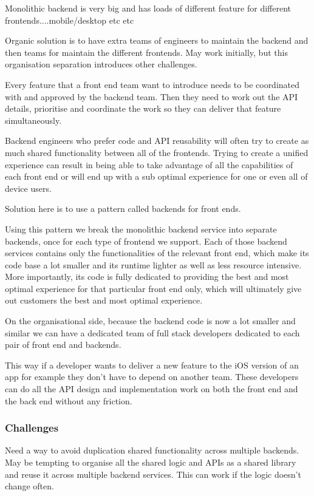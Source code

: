 Monolithic backend is very big and has loads of different feature for different frontends....mobile/desktop etc etc

Organic solution is to have extra teams of engineers to maintain the backend and then teams for maintain the different frontends.
May work initially, but this organisation separation introduces other challenges.

Every feature that a front end team want to introduce needs to be coordinated with and approved by the backend team.
Then they need to work out the API details, prioritise and coordinate the work so they can deliver that feature simultaneously.

Backend engineers who prefer code and API reusability will often try to create as much shared functionality between all of the frontends.
Trying to create a unified experience can result in being able to take advantage of all the capabilities of each front end or will end up with a sub optimal experience for one or even all of device users.

Solution here is to use a pattern called backends for front ends.

Using this pattern we break the monolithic backend service into separate backends, once for each type of frontend we support.
Each of those backend services contains only the functionalities of the relevant front end, which make its code base a lot smaller and its runtime lighter as well as less resource intensive.
More importantly, its code is fully dedicated to providing the best and most optimal experience for that particular front end only, which will ultimately give out customers the best and most optimal experience.

On the organisational side, because the backend code is now a lot smaller and similar we can have a dedicated team of full stack developers dedicated to each pair of front end and backends.

This way if a developer wants to deliver a new feature to the iOS version of an app for example they don't have to depend on another team.
These developers can do all the API design and implementation work on both the front end and the back end without any friction.

\subsubsection{Challenges}
Need a way to avoid duplication shared functionality across multiple backends.
May be tempting to organise all the shared logic and APIs as a shared library and reuse it across multiple backend services.
This can work if the logic doesn't change often.

